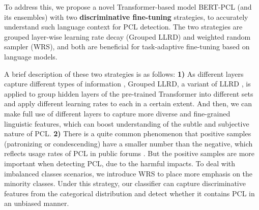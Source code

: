 \documentclass[11pt]{article}
\begin{document}
To address this, we propose a novel Transformer-based model BERT-PCL (and its ensembles) with two \textbf{discriminative fine-tuning} strategies, to accurately understand such language context for PCL detection. The two strategies are grouped layer-wise learning rate decay (Grouped LLRD) and weighted random sampler (WRS), and both are beneficial for task-adaptive fine-tuning based on language models. 

A brief description of these two strategies is as follows:
\textbf{1)} As different layers capture different types of information \citep{yosinski2014transferable}, Grouped LLRD, a variant of LLRD \citep{DBLP:conf/acl/RuderH18,DBLP:conf/iclr/0007WKWA21}, is applied to group hidden layers of the pre-trained Transformer \citep{vaswani2017attention} into different sets and apply different learning rates to each in a certain extent. And then, we can make full use of different layers to capture more diverse and fine-grained linguistic features, which can boost understanding of the subtle and subjective nature of PCL. \textbf{2)} There is a quite common phenomenon that positive samples (patronizing or condescending) have a smaller number than the negative, which reflects usage rates of PCL in public forums \citep{DBLP:conf/emnlp/WangP19, perez2020don}. But the positive samples are more important when detecting PCL, due to the harmful impacts. To deal with imbalanced classes scenarios, we introduce WRS to place more emphasis on the minority classes. Under this strategy, our classifier can capture discriminative features from the categorical distribution and detect whether it contains PCL in an unbiased manner.
\end{document}
